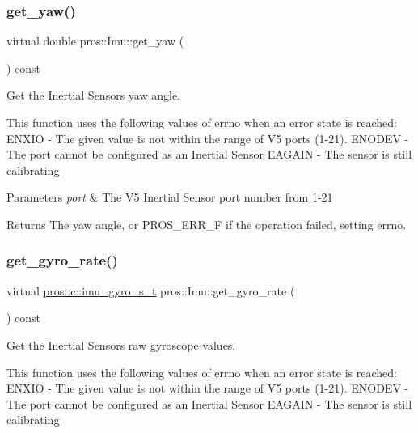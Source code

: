 \subsubsection{\texorpdfstring{get\+\_\+yaw()}{get\_yaw()}}
{\footnotesize\ttfamily virtual double pros\+::\+Imu\+::get\+\_\+yaw (\begin{DoxyParamCaption}{ }\end{DoxyParamCaption}) const\hspace{0.3cm}{\ttfamily [virtual]}}



Get the Inertial Sensor\textquotesingle{}s yaw angle. 

This function uses the following values of errno when an error state is reached\+: E\+N\+X\+IO -\/ The given value is not within the range of V5 ports (1-\/21). E\+N\+O\+D\+EV -\/ The port cannot be configured as an Inertial Sensor E\+A\+G\+A\+IN -\/ The sensor is still calibrating


\begin{DoxyParams}{Parameters}
{\em port} & The V5 Inertial Sensor port number from 1-\/21 \\
\hline
\end{DoxyParams}
\begin{DoxyReturn}{Returns}
The yaw angle, or P\+R\+O\+S\+\_\+\+E\+R\+R\+\_\+F if the operation failed, setting errno. 
\end{DoxyReturn}
\mbox{\label{classpros_1_1Imu_a632aecd3cf0866827ba6521dc19f357d}} 
\subsubsection{\texorpdfstring{get\+\_\+gyro\+\_\+rate()}{get\_gyro\_rate()}}
{\footnotesize\ttfamily virtual \hyperlink{imu_8h_a5b9e240cfb181cce3c741e29efbbbf23}{pros\+::c\+::imu\+\_\+gyro\+\_\+s\+\_\+t} pros\+::\+Imu\+::get\+\_\+gyro\+\_\+rate (\begin{DoxyParamCaption}{ }\end{DoxyParamCaption}) const\hspace{0.3cm}{\ttfamily [virtual]}}



Get the Inertial Sensor\textquotesingle{}s raw gyroscope values. 

This function uses the following values of errno when an error state is reached\+: E\+N\+X\+IO -\/ The given value is not within the range of V5 ports (1-\/21). E\+N\+O\+D\+EV -\/ The port cannot be configured as an Inertial Sensor E\+A\+G\+A\+IN -\/ The sensor is still calibrating


